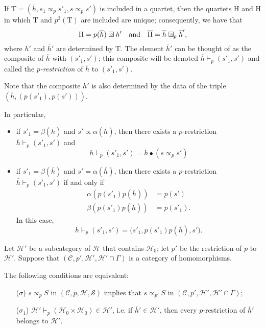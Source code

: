\documentclass[a4paper,fleqn]{article}
\theoremstyle{plain}
\newenvironment{proposition}[1]
  {\renewcommand\theinnerproposition{#1}\innerproposition}
  {\endinnerproposition}
\theoremstyle{definition}
\newcommand{\oldpage}[1]{{\marginpar{\footnotesize$\bigg\vert$\,\,\,\,\textit{p.~#1}}}}
\newcommand{\textand}{\quad\text{and}\quad}
\newcommand{\CC}{\mathcal{C}}
\newcommand{\HH}{\mathcal{H}}
\newcommand{\rHH}{\mathrm{H}}
\renewcommand{\SS}{\mathcal{S}}
\newcommand{\subs}{\mathrel{\propto}}
\newcommand{\sqsubs}{\mathrel{\mathrlap{\square}\raisebox{.17em}{\scaleobj{0.65}{\,\,\propto}}}}
\begin{document}
If $\mathrm{T}=(\overline{h},s_1\subs_p s'_1,s\subs_p s')$ is included in a quartet, then the quartets $\overline{\rHH}$ and $\rHH$ in which $\mathrm{T}$ and $p^3(\mathrm{T})$ are included are unique;
consequently, we have that
\[
  \rHH = p(\overline{h})\sqsubs h'
  \textand
  \overline{\rHH} = \overline{h}\sqsubs_p \overline{h}',
\]
\oldpage{367}
where $h'$ and $\overline{h}'$ are determined by $\mathrm{T}$.
The element $\overline{h}'$ can be thought of as the composite of $\overline{h}$ with $(s'_1,s')$;
this composite will be denoted $\overline{h}\vdash_p(s'_1,s')$ and called the \emph{$p$-restriction} of $\overline{h}$ to $(s'_1,s')$.

Note that the composite $\overline{h}'$ is also determined by the data of the triple $(\overline{h},(p(s'_1),p(s')))$.

In particular,

\begin{itemize}
  \item if $s'_1=\beta(\overline{h})$ and $s'\subs\alpha(\overline{h})$, then there exists a $p$-restriction $\overline{h}\vdash_p(s'_1,s')$ and
    \[
      \overline{h}\vdash_p(s'_1,s')
      = \overline{h}\bullet(s\subs_p s')
    \]
  \item if $s'_1=\beta(\overline{h})$ and $s'=\alpha(\overline{h})$, then there exists a $p$-restriction $\overline{h}\vdash_p(s'_1,s')$ if and only if
    \[
      \begin{aligned}
        \alpha(p(s'_1)p(\overline{h}))
        &= p(s')
      \\\beta(p(s'_1)p(\overline{h}))
        &= p(s'_1).
      \end{aligned}
    \]
    In this case,
    \[
      \overline{h}\vdash_p(s'_1,s')
      = \big(
        s'_1, p(s'_1)p(\overline{h}), s'
      \big).
    \]
\end{itemize}

Let $\HH'$ be a subcategory of $\HH$ that contains $\HH_0$;
let $p'$ be the restriction of $p$ to $\HH'$.
Suppose that $(\CC,p',\HH',\HH'\cap\Gamma)$ is a category of homomorphisms.

\begin{proposition}{10}
\label{proposition:i-10}
  The following conditions are equivalent:

  \begin{enumerate}
    \item[\normalfont($\sigma$)] $s\subs_p S$ in $(\CC,p,\HH,\SS)$ implies that $s\subs_{p'}S$ in $(\CC,p',\HH',\HH'\cap\Gamma)$;

    \item[\normalfont($\sigma_1$)] $\HH'\vdash_p(\HH_0\times\HH_0)\in\HH'$, i.e. if $\overline{h}'\in\HH'$, then every $p$-restriction of $\overline{h}'$ belongs to $\HH'$.
  \end{enumerate}
\end{proposition}
\end{document}
